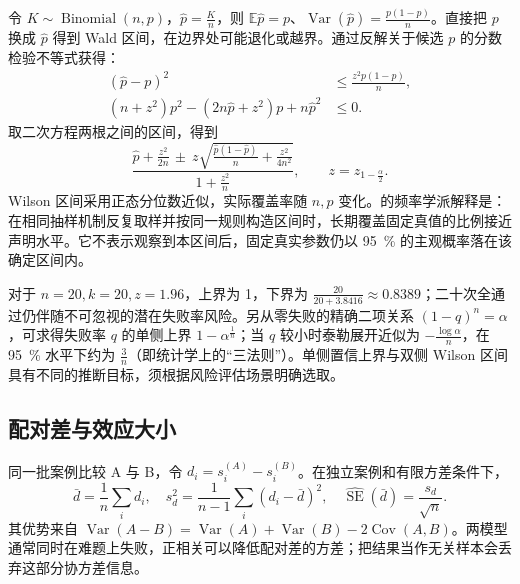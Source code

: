 \documentclass[../textbook.tex]{subfiles}
\begin{document}
令 $K\sim\operatorname{Binomial}(n,p)$，$\hat p=\frac{K}{n}$，则 $\mathbb E\hat p=p$、$\operatorname{Var}(\hat p)=\frac{p(1-p)}{n}$。直接把 $p$ 换成 $\hat p$ 得到 Wald 区间，在边界处可能退化或越界。通过反解关于候选 $p$ 的分数检验不等式获得\cite{wilson1927inference}：
\begin{align}
 (\hat p-p)^2&\leq \frac{z^2p(1-p)}{n},\\
 (n+z^2)p^2-(2n\hat p+z^2)p+n\hat p^2&\leq0.
\end{align}
取二次方程两根之间的区间，得到
\begin{equation}
 \frac{\hat p+\frac{z^2}{2n}\,\pm\ z\sqrt{\frac{\hat p(1-\hat p)}{n}+\frac{z^2}{4n^2}}}{1+\frac{z^2}{n}},
 \qquad z=z_{1-\frac{\alpha}{2}}.
 \label{eq:eval-wilson}
\end{equation}
Wilson 区间采用正态分位数近似，实际覆盖率随 $n,p$ 变化。的频率学派解释是：在相同抽样机制反复取样并按同一规则构造区间时，长期覆盖固定真值的比例接近声明水平。它不表示观察到本区间后，固定真实参数仍以 \qty{95}{\percent} 的主观概率落在该确定区间内。

对于 $n=20,k=20,z=1.96$，上界为 1，下界为 $\frac{20}{20+3.8416}\approx0.8389$；二十次全通过仍伴随不可忽视的潜在失败率风险。另从零失败的精确二项关系 $(1-q)^n=\alpha$，可求得失败率 $q$ 的单侧上界 $1-\alpha^{\frac{1}{n}}$；当 $q$ 较小时泰勒展开近似为 $-\frac{\log\alpha}{n}$，在 \qty{95}{\percent} 水平下约为 $\frac{3}{n}$（即统计学上的“三法则”）。单侧置信上界与双侧 Wilson 区间具有不同的推断目标，须根据风险评估场景明确选取。


\subsection{配对差与效应大小}
同一批案例比较 A 与 B，令 $d_i=s_i^{(A)}-s_i^{(B)}$。在独立案例和有限方差条件下，
\begin{equation}
 \bar d=\frac1n\sum_i d_i,\quad
 s_d^2=\frac1{n-1}\sum_i(d_i-\bar d)^2,\quad
 \widehat{\operatorname{SE}}(\bar d)=\frac{s_d}{\sqrt n}.
 \label{eq:eval-paired}
\end{equation}
其优势来自 $\operatorname{Var}(A-B)=\operatorname{Var}(A)+\operatorname{Var}(B)-2\operatorname{Cov}(A,B)$。两模型通常同时在难题上失败，正相关可以降低配对差的方差；把结果当作无关样本会丢弃这部分协方差信息。
\end{document}
